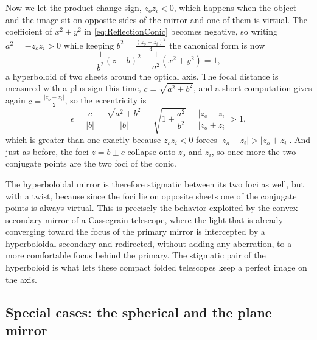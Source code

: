                 Now we let the product change sign, $z_oz_i<0$, which happens when the object and the image sit on opposite sides of the mirror and one of them is virtual. The coefficient of $x^2+y^2$ in \ref{eq:ReflectionConic} becomes negative, so writing $a^2 = -z_oz_i>0$ while keeping $b^2 = \frac{(z_o+z_i)^2}{4}$ the canonical form is now
                \begin{equation}
                    \frac{1}{b^2}(z-b)^2 - \frac{1}{a^2}(x^2+y^2) = 1,
                \end{equation}
                a hyperboloid of two sheets around the optical axis. The focal distance is measured with a plus sign this time, $c = \sqrt{a^2+b^2}$, and a short computation gives again $c = \frac{|z_o-z_i|}{2}$, so the eccentricity is
                \begin{equation}
                    \epsilon = \frac{c}{|b|} = \frac{\sqrt{a^2+b^2}}{|b|} = \sqrt{1+\frac{a^2}{b^2}} = \frac{|z_o-z_i|}{|z_o+z_i|}>1,
                \end{equation}
                which is greater than one exactly because $z_oz_i<0$ forces $|z_o-z_i|>|z_o+z_i|$. And just as before, the foci $z = b\pm c$ collapse onto $z_o$ and $z_i$, so once more the two conjugate points are the two foci of the conic.

                The hyperboloidal mirror is therefore stigmatic between its two foci as well, but with a twist, because since the foci lie on opposite sheets one of the conjugate points is always virtual. This is precisely the behavior exploited by the convex secondary mirror of a Cassegrain telescope, where the light that is already converging toward the focus of the primary mirror is intercepted by a hyperboloidal secondary and redirected, without adding any aberration, to a more comfortable focus behind the primary. The stigmatic pair of the hyperboloid is what lets these compact folded telescopes keep a perfect image on the axis.

        \subsection{Special cases: the spherical and the plane mirror}

